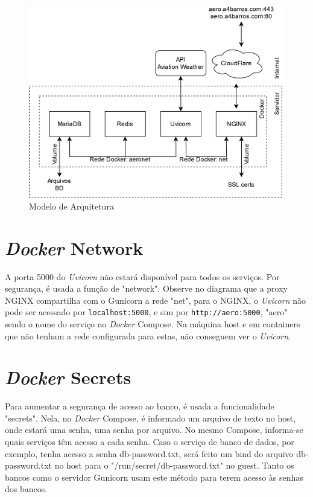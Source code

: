 \begin{figure}[ht]
    \begin{center}
    \includegraphics[width=\linewidth]{img/arquitetura.png}
    \caption{Modelo de Arquitetura}
    \label{fig:arquitetura}
    \end{center}
\end{figure}

\section{\textit{Docker} Network}
A porta 5000 do \textit{Uvicorn} não estará disponível para todos os serviços. Por segurança, é usada a função de
"network". Observe no diagrama que a proxy NGINX compartilha com o Gunicorn a rede "net", para o NGINX,
o \textit{Uvicorn} não pode ser acessado por \texttt{localhost:5000}, e sim por \texttt{http://aero:5000}, "aero"
sendo o nome do serviço no \textit{Docker} Compose. Na máquina host e em containers que não tenham a rede
configurada para estas, não conseguem ver o \textit{Uvicorn}.


\section{\textit{Docker} Secrets}

Para aumentar a segurança de acesso ao banco, é usada a funcionalidade "secrets". Nela, no \textit{Docker} Compose,
é informado um arquivo de texto no host, onde estará uma senha, uma senha por arquivo. No mesmo Compose,
informa-se quais serviços têm acesso a cada senha. Caso o serviço de banco de dados, por exemplo, tenha
acesso a senha db-password.txt, será feito um bind do arquivo db-password.txt no host para o "/run/secret/db-password.txt"
no guest.
Tanto os bancos como o servidor Gunicorn usam este método para terem acesso às senhas dos bancos.

